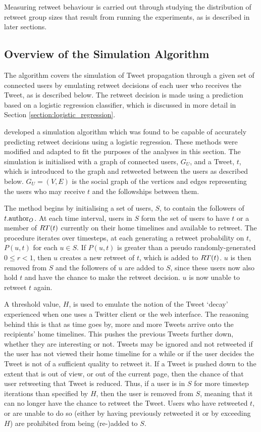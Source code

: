 Measuring retweet behaviour is carried out through studying the distribution of retweet group sizes that result from running the experiments, as is described in later sections.

\subsection{Overview of the Simulation Algorithm}
The algorithm covers the simulation of Tweet propagation through a given set of connected users by emulating retweet decisions of each user who receives the Tweet, as is described below. The retweet decision is made using a prediction based on a logistic regression classifier, which is discussed in more detail in Section \ref{section:logistic_regression}.

\citet{zhu11} developed a simulation algorithm which was found to be capable of accurately predicting retweet decisions using a logistic regression. These methods were modified and adapted to fit the purposes of the analyses in this section. The simulation is initialised with a graph of connected users, $G_U$, and a Tweet, $t$, which is introduced to the graph and retweeted between the users as described below. $G_U = (V,E)$ is the social graph of the vertices and edges representing the users who may receive $t$ and the followships between them.

The method begins by initialising a set of users, $S$, to contain the followers of $t.\textrm{author}_O$. At each time interval, users in $S$ form the set of users to have $t$ or a member of $RT(t)$ currently on their home timelines and available to retweet. The procedure iterates over timesteps, at each generating a retweet probability on $t$, $P(u,t)$ for each $u \in S$. If $P(u,t)$ is greater than a pseudo randomly-generated $0 \leq r < 1$, then $u$ creates a new retweet of $t$, which is added to $RT(t)$. $u$ is then removed from $S$ and the followers of $u$ are added to $S$, since these users now also hold $t$ and have the chance to make the retweet decision. $u$ is now unable to retweet $t$ again.

A threshold value, $H$, is used to emulate the notion of the Tweet `decay' experienced when one uses a Twitter client or the web interface. The reasoning behind this is that as time goes by, more and more Tweets arrive onto the recipients' home timelines. This pushes the previous Tweets further down, whether they are interesting or not. Tweets may be ignored and not retweeted if the user has not viewed their home timeline for a while or if the user decides the Tweet is not of a sufficient quality to retweet it. If a Tweet is pushed down to the extent that is out of view, or out of the current page, then the chance of that user retweeting that Tweet is reduced. Thus, if a user is in $S$ for more timestep iterations than specified by $H$, then the user is removed from $S$, meaning that it can no longer have the chance to retweet the Tweet. Users who have retweeted $t$, or are unable to do so (either by having previously retweeted it or by exceeding $H$) are prohibited from being (re-)added to $S$.


